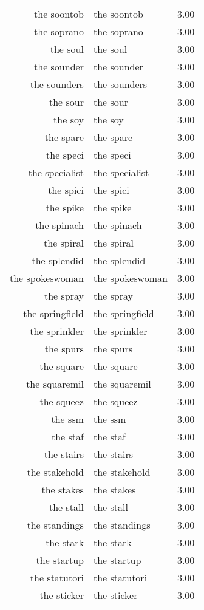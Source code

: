 \begin{table}[ht]
\begin{tabular}{rlr}
  the soontob & the soontob & 3.00 \\ 
  the soprano & the soprano & 3.00 \\ 
  the soul & the soul & 3.00 \\ 
  the sounder & the sounder & 3.00 \\ 
  the sounders & the sounders & 3.00 \\ 
  the sour & the sour & 3.00 \\ 
  the soy & the soy & 3.00 \\ 
  the spare & the spare & 3.00 \\ 
  the speci & the speci & 3.00 \\ 
  the specialist & the specialist & 3.00 \\ 
  the spici & the spici & 3.00 \\ 
  the spike & the spike & 3.00 \\ 
  the spinach & the spinach & 3.00 \\ 
  the spiral & the spiral & 3.00 \\ 
  the splendid & the splendid & 3.00 \\ 
  the spokeswoman & the spokeswoman & 3.00 \\ 
  the spray & the spray & 3.00 \\ 
  the springfield & the springfield & 3.00 \\ 
  the sprinkler & the sprinkler & 3.00 \\ 
  the spurs & the spurs & 3.00 \\ 
  the square & the square & 3.00 \\ 
  the squaremil & the squaremil & 3.00 \\ 
  the squeez & the squeez & 3.00 \\ 
  the ssm & the ssm & 3.00 \\ 
  the staf & the staf & 3.00 \\ 
  the stairs & the stairs & 3.00 \\ 
  the stakehold & the stakehold & 3.00 \\ 
  the stakes & the stakes & 3.00 \\ 
  the stall & the stall & 3.00 \\ 
  the standings & the standings & 3.00 \\ 
  the stark & the stark & 3.00 \\ 
  the startup & the startup & 3.00 \\ 
  the statutori & the statutori & 3.00 \\ 
  the sticker & the sticker & 3.00 \\ 

\end{tabular}
\end{table}
